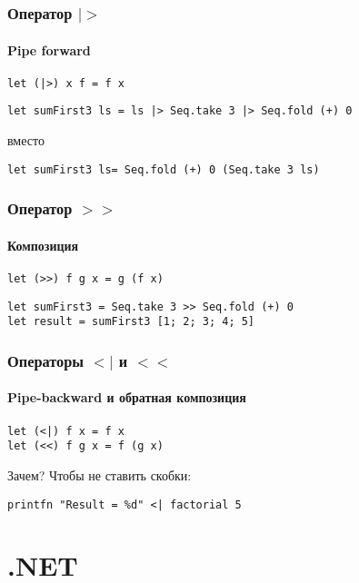 \documentclass{../../slides-style}
\begin{document}
    \begin{frame}[fragile]
        \frametitle{Оператор $|>$}
        \framesubtitle{Pipe forward}
        \begin{verbatim}
let (|>) x f = f x
        \end{verbatim}

        \begin{verbatim}
let sumFirst3 ls = ls |> Seq.take 3 |> Seq.fold (+) 0
        \end{verbatim}
        вместо
        \begin{verbatim}
let sumFirst3 ls= Seq.fold (+) 0 (Seq.take 3 ls)
        \end{verbatim}
    \end{frame}

    \begin{frame}[fragile]
        \frametitle{Оператор $>>$}
        \framesubtitle{Композиция}
        \begin{verbatim}
let (>>) f g x = g (f x)
        \end{verbatim}
        \begin{verbatim}
let sumFirst3 = Seq.take 3 >> Seq.fold (+) 0
let result = sumFirst3 [1; 2; 3; 4; 5]
        \end{verbatim}
    \end{frame}

    \begin{frame}[fragile]
        \frametitle{Операторы $<|$ и $<<$}
        \framesubtitle{Pipe-backward и обратная композиция}
        \begin{verbatim}
let (<|) f x = f x
let (<<) f g x = f (g x)
        \end{verbatim}
        Зачем? Чтобы не ставить скобки:
        \begin{verbatim}
printfn "Result = %d" <| factorial 5
        \end{verbatim}
    \end{frame}

    \section{.NET}
\end{document}
